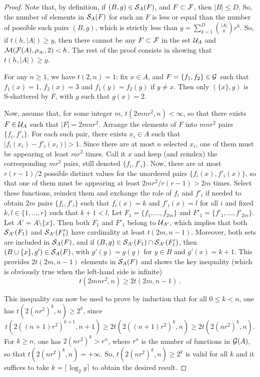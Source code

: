 \begin{proof}
Note that, by definition, if $(B,g)\in {\mathcal S}_A(F)$, and $F\subset{\mathcal F}$, then $|B| \leq D$. So, the number of elements in ${\mathcal S}_A(F)$ for such an $F$ is less or equal than the number of possible such pairs $(B,g)$, which is strictly less than
$y = \sum_{k=1}^D \binom{|A|}{k} r^k$. So, if $t(h, |A|) \geq y$, then there cannot be any $F\subset{\mathcal F}$ in the set ${\mathcal U}_A$ and ${\mathcal M}({\mathcal F}(A), \rho_\infty, 2) < h$. The rest of the proof consists in showing that  $t(h, |A|) \geq y$. 
\medskip

For any $n\geq 1$, we have $t(2,n) = 1$: fix $x\in A$, and $F = \{f_1, f_2\}\in {\mathcal G}$ such that $f_1(x) = 1$, $f_2(x) = 3$ and $f_1(y) = f_2(y)$ if $y\neq x$. Then only $(\{x\}, g)$ is S-shattered by $F$, with $g$ such that $g(x) = 2$.

Now, assume that, for some integer $m$, $t(2mnr^2, n) <\infty$, so that there exists $F\in{\mathcal U}_A$ such that $|F| = 2mnr^2$. Arrange the elements of $F$ into $mnr^2$ pairs $\{f_i, f'_i\}$. For each such pair, there exists $x_i\in A$ such that $|f_i(x_i) - f'_i(x_i)| > 1$. Since there are at most $n$ selected $x_i$, one of them must be appearing at least $mr^2$ times. Call it $x$ and keep (and reindex) the corresponding  $mr^2$ pairs, still denoted $\{f_i, f'_i\}$. Now, there are at most $r(r-1)/2$ possible distinct values for the unordered pairs $\{f_i(x), f'_i(x)\}$, so that one of them must be appearing at least $2mr^2/r(r-1) > 2m$ times. Select these functions, reindex them  and exchange the role of $f_i$ and $f'_i$ if needed to obtain $2m$ pairs $\{f_i, f'_i\}$ such that $f_i(x) = k$ and $f'_i(x) = l$ for all $i$ and fixed $k,l\in \{1, \ldots, r\}$ such that $k+1<l$. 
Let $F_1 = \{f_1, \ldots, f_{2m}\}$ and $F'_1 = \{f'_1, \ldots, f'_{2m}\}$. Let $A' = A\setminus\{x\}$. Then both $F_1$ and $F'_1$ belong to ${\mathcal U}_{A'}$, which implies that both ${\mathcal S}_{A'}(F_1)$ and ${\mathcal S}_{A'}(F'_1)$ have cardinality at least $t(2m, n-1)$. Moreover, both sets are included in ${\mathcal S}_A(F)$, and if $(B,g) \in {\mathcal S}_{A'}(F_1)\cap{\mathcal S}_{A'}(F'_1)$, then $(B\cup\{x\}, g')\in {\mathcal S}_A(F)$, with $g'(y) = g(y)$ for $y\in B$ and $g'(x) = k+1$. This provides $2t(2m, n-1)$ elements in ${\mathcal S}_A(F)$ and shows the key inequality (which is obviously true when the left-hand side is infinite)
\[
t(2mnr^2, n) \geq 2 t(2m, n-1)\,.
\]

This inequality can now be used to prove by induction that for all $0\leq k < n$, one has $t(2(nr^2)^k, n) \geq 2^k$, since
\[
t(2((n+1)r^2)^{k+1}, n+1) \geq 2 t(2((n+1)r^2)^{k}, n) \geq 2  t(2(nr^2)^k, n).
\]
For $k\geq n$, one has $2(nr^2)^k > r^n$, where $r^n$ is the number of functions in ${\mathcal G}(A)$, so that $t(2(nr^2)^k, n) = +\infty$. So, $t(2(nr^2)^k, n) \geq 2^k$ is valid for all $k$ and  it suffices to take $k = \lceil \log_2y\rceil$ to obtain the desired result.
\bigskip


\end{proof}
